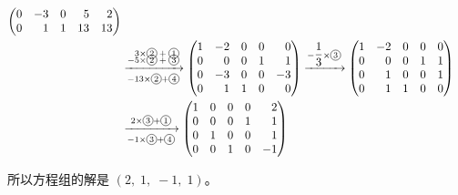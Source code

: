 \begin{align*}
\begin{pmatrix*}[r]
            0 & -3 &  0 &  5 & 2 \\
            0 &  1 &  1 & 13 & 13
        \end{pmatrix*} \\
    & \xrightarrow[-13 \times \tc{2} + \tc{4}]{
        \scriptsize\begin{aligned}
            3 \times &\tc{2} + \tc{1} \\[-1em]
            -5 \times &\tc{2} + \tc{3}
        \end{aligned}
    }
        \begin{pmatrix*}[r]
            1 & -2 &  0 &  0 & 0 \\
            0 &  0 &  0 &  1 & 1 \\
            0 & -3 &  0 &  0 & -3 \\
            0 &  1 &  1 &  0 & 0
        \end{pmatrix*}
        \xrightarrow{-\dfrac{1}{3} \times \tc{3}}
        \begin{pmatrix*}[r]
            1 & -2 &  0 &  0 & 0 \\
            0 &  0 &  0 &  1 & 1 \\
            0 &  1 &  0 &  0 & 1 \\
            0 &  1 &  1 &  0 & 0
        \end{pmatrix*} \\
    &\xrightarrow[-1 \times \tc{3} + \tc{4}]{2 \times \tc{3} + \tc{1}}
    \begin{pmatrix*}[r]
        1 &  0 &  0 &  0 & 2 \\
        0 &  0 &  0 &  1 & 1 \\
        0 &  1 &  0 &  0 & 1 \\
        0 &  0 &  1 &  0 & -1
    \end{pmatrix*}
\end{align*}

所以方程组的解是 $(2,\; 1,\; -1,\; 1)$。



